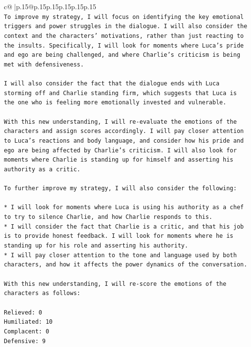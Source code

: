 \documentclass{article}
\begin{document}
{\begin{supertabular}{c@{$\;$}|p{.15\linewidth}@{}p{.15\linewidth}p{.15\linewidth}p{.15\linewidth}p{.15\linewidth}p{.15\linewidth}}
{{{\\ 
\texttt{To improve my strategy, I will focus on identifying the key emotional triggers and power struggles in the dialogue. I will also consider the context and the characters' motivations, rather than just reacting to the insults. Specifically, I will look for moments where Luca's pride and ego are being challenged, and where Charlie's criticism is being met with defensiveness. } \\
\\ 
\texttt{I will also consider the fact that the dialogue ends with Luca storming off and Charlie standing firm, which suggests that Luca is the one who is feeling more emotionally invested and vulnerable. } \\
\\ 
\texttt{With this new understanding, I will re{-}evaluate the emotions of the characters and assign scores accordingly. I will pay closer attention to Luca's reactions and body language, and consider how his pride and ego are being affected by Charlie's criticism. I will also look for moments where Charlie is standing up for himself and asserting his authority as a critic. } \\
\\ 
\texttt{To further improve my strategy, I will also consider the following:} \\
\\ 
\texttt{* I will look for moments where Luca is using his authority as a chef to try to silence Charlie, and how Charlie responds to this.} \\
\texttt{* I will consider the fact that Charlie is a critic, and that his job is to provide honest feedback. I will look for moments where he is standing up for his role and asserting his authority.} \\
\texttt{* I will pay closer attention to the tone and language used by both characters, and how it affects the power dynamics of the conversation.} \\
\\ 
\texttt{With this new understanding, I will re{-}score the emotions of the characters as follows:} \\
\\ 
\texttt{Relieved: 0} \\
\texttt{Humiliated: 10} \\
\texttt{Complacent: 0} \\
\texttt{Defensive: 9} \\
\\ 
\\ 
}}}
\end{supertabular}}
\end{document}
